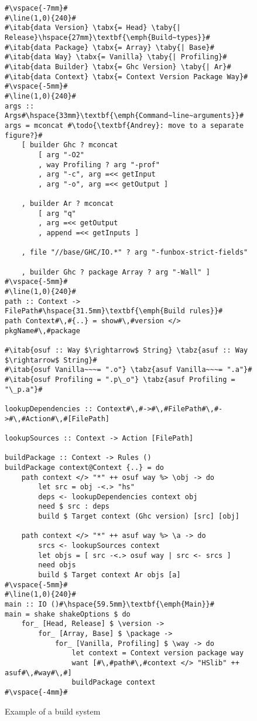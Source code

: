 \begin{figure}
\begin{lstlisting}
#\vspace{-7mm}#
#\line(1,0){240}#
#\itab{data Version} \tabx{= Head} \taby{| Release}\hspace{27mm}\textbf{\emph{Build~types}}#
#\itab{data Package} \tabx{= Array} \taby{| Base}#
#\itab{data Way} \tabx{= Vanilla} \taby{| Profiling}#
#\itab{data Builder} \tabx{= Ghc Version} \taby{| Ar}#
#\itab{data Context} \tabx{= Context Version Package Way}#
#\vspace{-5mm}#
#\line(1,0){240}#
args :: Args#\hspace{33mm}\textbf{\emph{Command~line~arguments}}#
args = mconcat #\todo{\textbf{Andrey}: move to a separate figure?}#
    [ builder Ghc ? mconcat
        [ arg "-O2"
        , way Profiling ? arg "-prof"
        , arg "-c", arg =<< getInput
        , arg "-o", arg =<< getOutput ]

    , builder Ar ? mconcat
        [ arg "q"
        , arg =<< getOutput
        , append =<< getInputs ]

    , file "//base/GHC/IO.*" ? arg "-funbox-strict-fields"

    , builder Ghc ? package Array ? arg "-Wall" ]
#\vspace{-5mm}#
#\line(1,0){240}#
path :: Context -> FilePath#\hspace{31.5mm}\textbf{\emph{Build rules}}#
path Context#\,#{..} = show#\,#version </> pkgName#\,#package

#\itab{osuf :: Way $\rightarrow$ String} \tabz{asuf :: Way $\rightarrow$ String}#
#\itab{osuf Vanilla~~~= ".o"} \tabz{asuf Vanilla~~~= ".a"}#
#\itab{osuf Profiling = ".p\_o"} \tabz{asuf Profiling = "\_p.a"}#

lookupDependencies :: Context#\,#->#\,#FilePath#\,#->#\,#Action#\,#[FilePath]

lookupSources :: Context -> Action [FilePath]

buildPackage :: Context -> Rules ()
buildPackage context@Context {..} = do
    path context </> "*" ++ osuf way %> \obj -> do
        let src = obj -<.> "hs"
        deps <- lookupDependencies context obj
        need $ src : deps
        build $ Target context (Ghc version) [src] [obj]

    path context </> "*" ++ asuf way %> \a -> do
        srcs <- lookupSources context
        let objs = [ src -<.> osuf way | src <- srcs ]
        need objs
        build $ Target context Ar objs [a]
#\vspace{-5mm}#
#\line(1,0){240}#
main :: IO ()#\hspace{59.5mm}\textbf{\emph{Main}}#
main = shake shakeOptions $ do
    for_ [Head, Release] $ \version ->
        for_ [Array, Base] $ \package ->
            for_ [Vanilla, Profiling] $ \way -> do
                let context = Context version package way
                want [#\,#path#\,#context </> "HSlib" ++ asuf#\,#way#\,#]
                buildPackage context
#\vspace{-4mm}#
\end{lstlisting}

\caption{Example of a build system\label{fig:example-abstractions}}
\end{figure}
